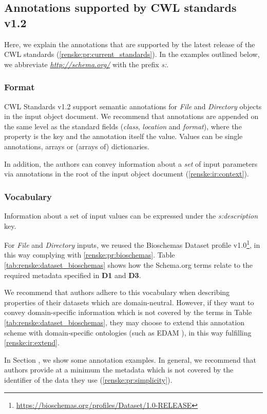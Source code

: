 \subsection{Annotations supported by CWL standards v1.2}
\label{sec:renske:annot_cwl_now}
Here, we explain the annotations that are supported by the latest release of the CWL standards (\ref{renske:pr:current_standards}). In the examples outlined below, we abbreviate \emph{\url{http://schema.org/}} with the prefix \emph{s:}.

\subsubsection{Format}
CWL Standards v1.2 support semantic annotations for \emph{File} and \emph{Directory} objects in the input object document. We recommend that annotations are appended on the same level as the standard fields (\emph{class}, \emph{location} and \emph{format}), where the property is the key and the annotation itself the value. Values can be single annotations, arrays or (arrays of) dictionaries. 

In addition, the authors can convey information about a \emph{set} of input parameters via annotations in the root of the input object document (\ref{renske:ir:context}). 

\subsubsection{Vocabulary}
Information about a set of input values can be expressed under the \emph{s:description} key. 

For \emph{File} and \emph{Directory} inputs, we reused the Bioschemas Dataset profile v1.0\footnote{\url{https://bioschemas.org/profiles/Dataset/1.0-RELEASE}}, in this way complying with \ref{renske:pr:bioschemas}. 
Table \ref{tab:renske:dataset_bioschemas} shows how the Schema.org terms relate to the required metadata specified in \textbf{D1} and  \textbf{D3}. 

We recommend that authors adhere to this vocabulary when describing properties of their datasets which are domain-neutral. However, if they want to convey domain-specific information which is not covered by the terms in Table \ref{tab:renske:dataset_bioschemas}, they may choose to extend this annotation scheme with domain-specific ontologies (such as EDAM \cite{Ison2013}), in this way fulfilling \ref{renske:ir:extend}. 

In Section \emph{}, we show some annotation examples. In general, we recommend that authors provide at a minimum the metadata which is not covered by the identifier of the data they use (\ref{renske:pr:simplicity}). 

